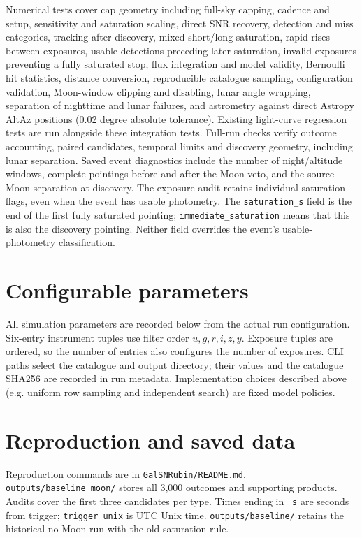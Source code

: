 \documentclass[11pt]{article}
\newcommand{\runpath}{../outputs/baseline_moon}
\begin{document}
Numerical tests cover cap geometry including full-sky capping, cadence and
setup, sensitivity and saturation scaling, direct SNR recovery, detection and
miss categories, tracking after discovery, mixed short/long saturation,
rapid rises between exposures, usable detections preceding later saturation,
invalid exposures preventing a fully saturated stop, flux integration and model validity,
Bernoulli hit statistics, distance conversion, reproducible catalogue sampling,
configuration validation, Moon-window clipping and disabling, lunar angle
wrapping, separation of nighttime and lunar failures, and astrometry against
direct Astropy AltAz positions
(0.02 degree absolute tolerance). Existing light-curve regression tests are run
alongside these integration tests. Full-run checks verify outcome accounting,
paired candidates, temporal limits and discovery geometry, including lunar
separation. Saved event diagnostics include the number of night/altitude
windows, complete pointings before and after the Moon veto, and the
source--Moon separation at discovery. The exposure audit retains individual
saturation flags, even when the event has usable photometry. The
\texttt{saturation\_s} field is the end of the first fully saturated pointing;
\texttt{immediate\_saturation} means that this is also the discovery pointing.
Neither field overrides the event's usable-photometry classification.

\clearpage
\section{Configurable parameters}
All simulation parameters are recorded below from the actual run configuration.
Six-entry instrument tuples use filter order $u,g,r,i,z,y$. Exposure tuples are
ordered, so the number of entries also configures the number of exposures.
CLI paths select the catalogue and output directory; their values and the
catalogue SHA256 are recorded in run metadata. Implementation choices described
above (e.g. uniform row sampling and independent search) are fixed model policies.
{\footnotesize\raggedright}

\section{Reproduction and saved data}
Reproduction commands are in \texttt{GalSNRubin/README.md}.
\texttt{outputs/baseline\_moon/} stores all 3,000 outcomes
and supporting products. Audits cover the first three candidates per type.
Times ending in \texttt{\_s} are seconds from trigger; \texttt{trigger\_unix} is
UTC Unix time. \texttt{outputs/baseline/} retains the historical no-Moon run
with the old saturation rule.
\end{document}
